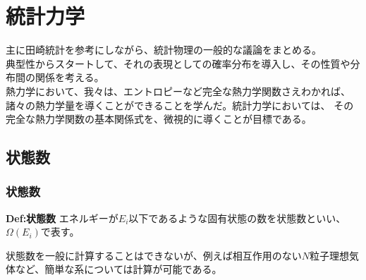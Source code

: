 \documentclass[a4paper,11pt]{jsarticle}
\numberwithin{equation}{section}
\begin{document}
\section{統計力学}
主に田崎統計を参考にしながら、統計物理の一般的な議論をまとめる。\\
典型性からスタートして、それの表現としての確率分布を導入し、その性質や分布間の関係を考える。\\

熱力学において、我々は、エントロピーなど完全な熱力学関数さえわかれば、諸々の熱力学量を導くことができることを学んだ。統計力学においては、
その完全な熱力学関数の基本関係式を、微視的に導くことが目標である。\\

\subsection{状態数}
\subsubsection{状態数}
\begin{itembox}[l]{\textbf{Def:状態数}}
  エネルギーが$E_i$以下であるような固有状態の数を状態数といい、$\Omega(E_i)$で表す。
\end{itembox}
状態数を一般に計算することはできないが、例えば相互作用のない$N$粒子理想気体など、簡単な系については計算が可能である。\\
\end{document}
